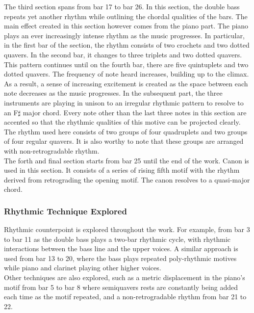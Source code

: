 \documentclass{article}
\begin{document}
The third section spans from bar 17 to bar 26. In this section, the double bass
repeats yet another rhythm while outlining the chordal qualities of the bars.
The main effect created in this section however comes from the piano part. The
piano plays an ever increasingly intense rhythm as the music progresses. In
particular, in the first bar of the section, the rhythm consists of two
crochets and two dotted quavers. In the second bar, it changes to three
triplets and two dotted quavers. This pattern continues until on the fourth
bar, there are five quintuplets and two dotted quavers. The frequency of note
heard increases, building up to the climax. As a result, a sense of increasing
excitement is created as the space between each note decreases as the music
progresses. In the subsequent part, the three instruments are playing in unison
to an irregular rhythmic pattern to resolve to an F\(\sharp\) major chord.
Every note other than the last three notes in this section are accented so that
the rhythmic qualities of this motive can be projected clearly. The rhythm used
here consists of two groups of four quadruplets and two groups of four regular
quavers. It is also worthy to note that these groups are arranged with
non-retrogradable rhythm.\\

The forth and final section starts from bar 25 until the end of the work.
Canon is used in this section. It consists of a series of rising fifth motif
with the rhythm derived from retrograding the opening motif. The canon resolves
to a quasi-major chord.\\

\subsubsection{Rhythmic Technique Explored} Rhythmic counterpoint is explored
throughout the work. For example, from bar 3 to bar 11 as the double bass plays
a two-bar rhythmic cycle, with rhythmic interactions between the bass
line and the upper voices. A similar approach is used from bar 13 to 20, where
the bass plays repeated poly-rhythmic motives while piano and clarinet playing
other higher voices.\\

Other techniques are also explored, such as a metric displacement in the
piano's motif from bar 5 to bar 8 where semiquavers rests are constantly being
added each time as the motif repeated, and a non-retrogradable rhythm from bar
21 to 22.\\
\end{document}
